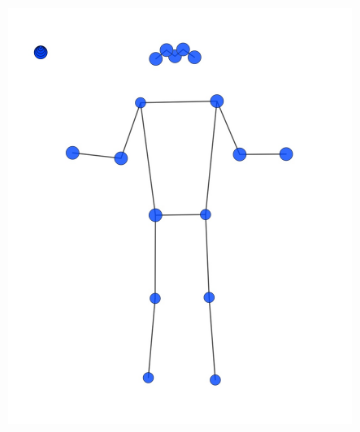 \begin{figure}[h]
\centering
\begin{subfigure}[b]{0.4\textwidth}
	\centering
	\includegraphics[width=\textwidth]{./images/data_info/pose_markup_examples/change_percentage}
	\caption{}
	\label{fig:any_correction}
\end{subfigure}
\begin{subfigure}[b]{0.4\textwidth}
	\centering

\end{subfigure}
\end{figure}
